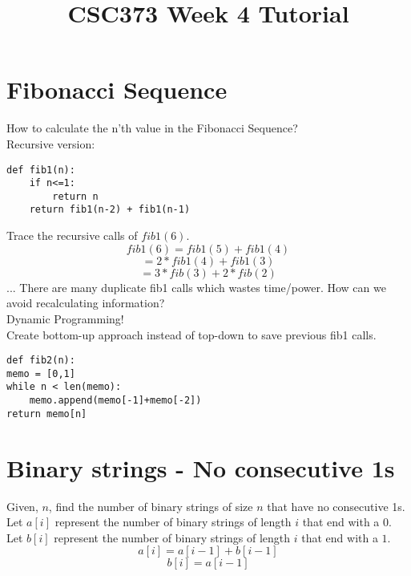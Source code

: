 \documentclass[]{article}
\title{CSC373 Week 4 Tutorial}
\author{}
\begin{document}
\maketitle

\section{Fibonacci Sequence}
How to calculate the n'th value in the Fibonacci Sequence? \\
Recursive version: 
\begin{lstlisting}
def fib1(n):
	if n<=1:
		return n
	return fib1(n-2) + fib1(n-1)
\end{lstlisting}

Trace the recursive calls of $fib1(6)$. \\
\[ fib1(6) = fib1(5) + fib1(4)\]
\[= 2*fib1(4) + fib1(3)\]
\[= 3*fib(3) + 2*fib(2)\]
...
There are many duplicate fib1 calls which wastes time/power. How can we avoid recalculating information?\\
Dynamic Programming!\\
Create bottom-up approach instead of top-down to save previous fib1 calls.

\begin{lstlisting}
def fib2(n):
memo = [0,1]
while n < len(memo):
	memo.append(memo[-1]+memo[-2])
return memo[n]
\end{lstlisting}



\section{Binary strings - No consecutive 1s}
Given, $n$, find the number of binary strings of size $n$ that have no consecutive 1s.\\
Let $a[i]$ represent the number of binary strings of length $i$ that end with a $0$. Let $b[i]$ represent the number of binary strings of length $i$ that end with a $1$.\\
\[a[i] = a[i-1] + b[i-1] \]
\[b[i] = a[i-1]\]
\end{document}
